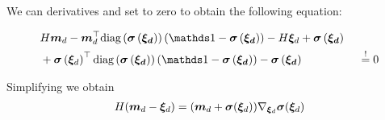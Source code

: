 We can derivatives and set to zero to obtain the following equation:

\begin{align}
\begin{split}
& H\md
- \md\T \diag{\vv{\sigma}\left(\vv{\ed}\right) } \left(\one - \vv{\sigma}\left(\vv{\ed}\right) \right)
- H \ed 
+ \vv{\sigma}\left(\vv{\ed}\right) \\
& + \vv{\sigma}\left(\ed\right)\T \diag{\vv{\sigma}\left(\vv{\ed}\right) } \left(\one - \vv{\sigma}\left(\vv{\ed}\right) \right)
- \vv{\sigma}\left(\vv{\ed}\right) 
\qquad\qquad\quad\mbeq 0
\end{split}
\end{align}

Simplifying we obtain
\begin{align}
H(\bm m_d -  { \bm \xi_d }) = (\bm m_d + \bm \sigma({ \bm \xi_d }))\nabla_{ \bm \xi_d } \bm \sigma({ \bm \xi_d })
\end{align}






